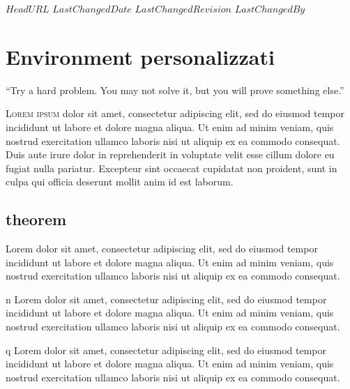 \svnidlong
{$HeadURL$}
{$LastChangedDate$}
{$LastChangedRevision$}
{$LastChangedBy$}

\chapter{Environment personalizzati}

\begin{introduction}
	``Try a hard problem. You may not solve it, but you will prove something else.''
	\begin{flushright}
	\end{flushright}
\end{introduction}
\lettrine[findent=1pt, nindent=0pt]{L}{orem ipsum} dolor sit amet, consectetur adipiscing elit, sed do eiusmod tempor incididunt ut labore et dolore magna aliqua. Ut enim ad minim veniam, quis nostrud exercitation ullamco laboris nisi ut aliquip ex ea commodo consequat. Duis aute irure dolor in reprehenderit in voluptate velit esse cillum dolore eu fugiat nulla pariatur. Excepteur sint occaecat cupidatat non proident, sunt in culpa qui officia deserunt mollit anim id est laborum.

\newpage

\section{theorem}

\begin{theorem}{}
	Lorem dolor sit amet, consectetur adipiscing elit, sed do eiusmod tempor incididunt ut labore et dolore magna aliqua. Ut enim ad minim veniam, quis nostrud exercitation ullamco laboris nisi ut aliquip ex ea commodo consequat.
\end{theorem}

\begin{theorem}{n}
	Lorem dolor sit amet, consectetur adipiscing elit, sed do eiusmod tempor incididunt ut labore et dolore magna aliqua. Ut enim ad minim veniam, quis nostrud exercitation ullamco laboris nisi ut aliquip ex ea commodo consequat.
\end{theorem}

\begin{theorem}{q}
	Lorem dolor sit amet, consectetur adipiscing elit, sed do eiusmod tempor incididunt ut labore et dolore magna aliqua. Ut enim ad minim veniam, quis nostrud exercitation ullamco laboris nisi ut aliquip ex ea commodo consequat.
\end{theorem}

